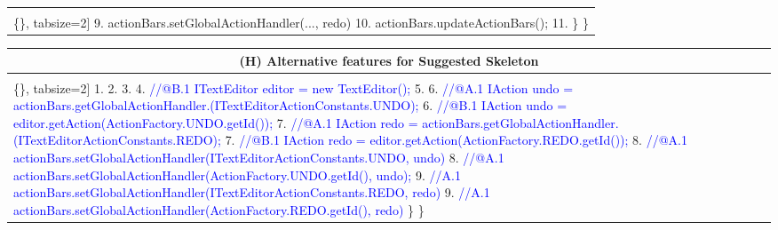 \begin{figure*}[!htb]
\begin{minipage}{0.5\textwidth}
\begin{tabular}{@{}p{}}
\begin{Verbatim}[commandchars=\\\{\}, tabsize=2]
9.     actionBars.setGlobalActionHandler(..., redo)   
10.   actionBars.updateActionBars();  
11.  \} \}
 \end{Verbatim}
      \vspace{-4mm}
  \\    \hline
\end{tabular} 
\end{minipage}
 \begin{minipage}{0.5\textwidth}
\scriptsize 
\begin{tabular}{@{}p{}} 
 \hline 
  \multicolumn{1}{c}{(H) Alternative features for Suggested Skeleton} \\ \hline
  \vspace{-4mm}
\begin{Verbatim}[commandchars=\\\{\}, tabsize=2]
1.
2.
3.
4. \textcolor{blue}{//@B.1 ITextEditor editor = new TextEditor();   }
5.
6. \textcolor{blue}{//@A.1 IAction undo = actionBars.getGlobalActionHandler.(ITextEditorActionConstants.UNDO);   }
6. \textcolor{blue}{//@B.1 IAction undo = editor.getAction(ActionFactory.UNDO.getId());   }
7. \textcolor{blue}{//@A.1 IAction redo = actionBars.getGlobalActionHandler.(ITextEditorActionConstants.REDO);   }
7. \textcolor{blue}{//@B.1 IAction redo = editor.getAction(ActionFactory.REDO.getId());   }
8. \textcolor{blue}{//@A.1 actionBars.setGlobalActionHandler(ITextEditorActionConstants.UNDO, undo)}
8. \textcolor{blue}{//@A.1 actionBars.setGlobalActionHandler(ActionFactory.UNDO.getId(), undo);}
9. \textcolor{blue}{//A.1   actionBars.setGlobalActionHandler(ITextEditorActionConstants.REDO, redo)}
9. \textcolor{blue}{//A.1   actionBars.setGlobalActionHandler(ActionFactory.REDO.getId(), redo)}
 \} \}
 \end{Verbatim}
      \vspace{-4mm}
  \\      \hline
\end{tabular} 
\end{minipage}
\caption{Cluster 2, 4: source code and suggested skeleton}
\label{fig:cluster2}
\end{figure*}


